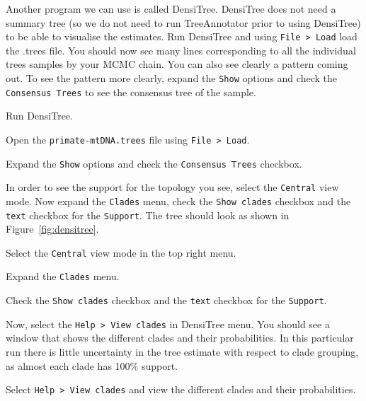 \documentclass[11pt]{article}
\begin{document}
Another program we can use is called DensiTree. DensiTree does not need a summary tree (so we do not need to run TreeAnnotator prior to using DensiTree) to be able to visualise the estimates. Run DensiTree and using \texttt{File > Load} load the .trees file. You should now see many lines corresponding to all the individual trees samples by your MCMC chain. You can also see clearly a pattern coming out. To see the pattern more clearly, expand the \texttt{Show} options and check the \texttt{Consensus Trees} to see the consensus tree of the sample.

\begin{framed}
Run DensiTree.

Open the \texttt{primate-mtDNA.trees} file using \texttt{File > Load}.

Expand the \texttt{Show} options and check the \texttt{Consensus Trees} checkbox.
\end{framed}

In order to see the support for the topology you see, select the \texttt{Central} view mode. Now expand the \texttt{Clades} menu, check the \texttt{Show clades} checkbox and the \texttt{text} checkbox for the \texttt{Support}. The tree should look as shown in Figure~\ref{fig:densitree}.

\begin{framed}
Select the \texttt{Central} view mode in the top right menu.

Expand the \texttt{Clades} menu.

Check the \texttt{Show clades} checkbox and the \texttt{text} checkbox for the \texttt{Support}.
\end{framed}

Now, select the \texttt{Help > View clades} in DensiTree menu. You should see a window that shows the different clades and their probabilities. In this particular run there is little uncertainty in the tree estimate with respect to clade grouping, as almost each clade has 100\% support.

\begin{framed}
Select \texttt{Help > View clades} and view the different clades and their probabilities.
\end{framed}
\end{document}
